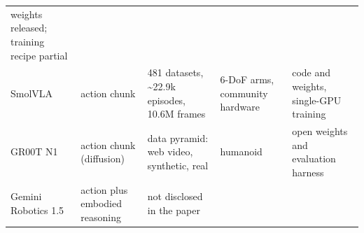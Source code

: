 \documentclass[
  10pt,
  english,
]{article}
\begin{document}
\begin{longtable}[]{@{}lllll@{}}
\begin{minipage}[t]{0.17\columnwidth}
weights released; training recipe partial\strut
\end{minipage}\tabularnewline
\begin{minipage}[t]{0.17\columnwidth}\raggedright
SmolVLA \citep{smolvla}\strut
\end{minipage} & \begin{minipage}[t]{0.17\columnwidth}\raggedright
action chunk\strut
\end{minipage} & \begin{minipage}[t]{0.17\columnwidth}\raggedright
481 datasets, \textasciitilde22.9k episodes, 10.6M frames\strut
\end{minipage} & \begin{minipage}[t]{0.17\columnwidth}\raggedright
6-DoF arms, community hardware\strut
\end{minipage} & \begin{minipage}[t]{0.17\columnwidth}\raggedright
code and weights, single-GPU training\strut
\end{minipage}\tabularnewline
\begin{minipage}[t]{0.17\columnwidth}\raggedright
GR00T N1 \citep{groot_n1}\strut
\end{minipage} & \begin{minipage}[t]{0.17\columnwidth}\raggedright
action chunk (diffusion)\strut
\end{minipage} & \begin{minipage}[t]{0.17\columnwidth}\raggedright
data pyramid: web video, synthetic, real\strut
\end{minipage} & \begin{minipage}[t]{0.17\columnwidth}\raggedright
humanoid\strut
\end{minipage} & \begin{minipage}[t]{0.17\columnwidth}\raggedright
open weights and evaluation harness\strut
\end{minipage}\tabularnewline
\begin{minipage}[t]{0.17\columnwidth}\raggedright
Gemini Robotics 1.5 \citep{gemini_robotics15}\strut
\end{minipage} & \begin{minipage}[t]{0.17\columnwidth}\raggedright
action plus embodied reasoning\strut
\end{minipage} & \begin{minipage}[t]{0.17\columnwidth}\raggedright
not disclosed in the paper\strut
\end{minipage} & \begin{minipage}[t]{0.17\columnwidth}\raggedright

\end{minipage}
\end{longtable}
\end{document}
